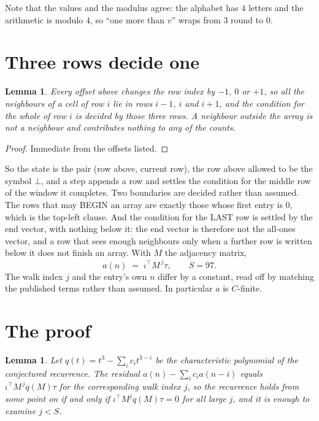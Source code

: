 \documentclass[11pt,a4paper]{article}
\theoremstyle{plain}
\newtheorem{lemma}[theorem]{Lemma}
\theoremstyle{definition}
\begin{document}
Note that the values and the modulus agree: the alphabet has $4$ letters and the arithmetic
is modulo $4$, so ``one more than $v$'' wraps from $3$ round to $0$.

\section{Three rows decide one}

\begin{lemma}\label{lem:win}
Every offset above changes the row index by $-1$, $0$ or $+1$, so all the neighbours of a cell
of row $i$ lie in rows $i-1$, $i$ and $i+1$, and the condition for the whole of row $i$ is
decided by those three rows. A neighbour outside the array is not a neighbour and contributes
nothing to any of the counts.
\end{lemma}

\begin{proof}
Immediate from the offsets listed.
\end{proof}

So the state is the pair (row above, current row), the row above allowed to be the symbol
$\bot$, and a step appends a row and settles the condition for the middle row of the window it
completes. Two boundaries are decided rather than assumed. The rows that may BEGIN an array are
exactly those whose first entry is $0$, which is the top-left clause. And the condition for the
LAST row is settled by the end vector, with nothing below it: the end vector is therefore not
the all-ones vector, and a row that sees enough neighbours only when a further row is written
below it does not finish an array. With $M$ the adjacency matrix,
\[
a(n)\;=\;\iota^{\!\top}M^{\,j}\tau ,\qquad S=97.
\]
The walk index $j$ and the entry's own $n$ differ by a constant, read off by matching the
published terms rather than assumed. In particular $a$ is $C$-finite.

\section{The proof}

\begin{lemma}\label{lem:crit}
Let $q(t)=t^{3}-\sum_i c_it^{3-i}$ be the characteristic polynomial of the
conjectured recurrence. The residual $a(n)-\sum_ic_ia(n-i)$ equals
$\iota^{\!\top}M^{\,j}q(M)\tau$ for the corresponding walk index $j$, so the recurrence
holds from some point on if and only if $\iota^{\!\top}M^{j}q(M)\tau=0$ for all large $j$,
and it is enough to examine $j<S$.
\end{lemma}
\end{document}
